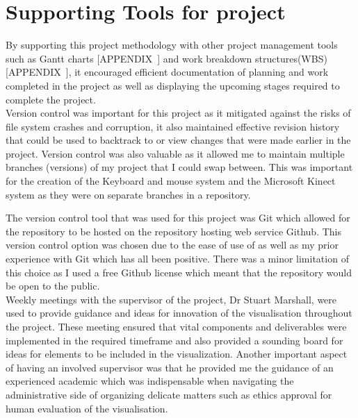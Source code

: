 \section{Supporting Tools for project}
By supporting this project methodology with other project management tools such
as Gantt charts [APPENDIX~] and work breakdown structures(WBS) [APPENDIX~], it
encouraged efficient documentation of planning and work completed in the project
as well as displaying the upcoming stages required to complete the project.
\\

Version control was important for this project as it mitigated against the risks
of file system crashes and corruption, it also maintained effective revision
history that could be used to backtrack to or view changes that were made
earlier in the project. Version control was also valuable as it allowed me to
maintain multiple branches (versions) of my project that I could swap between.
This was important for the creation of the Keyboard and mouse system and the
Microsoft Kinect system as they were on separate branches in a repository. 

The version control tool that was used for this project was Git which allowed
for the repository to be hosted on the repository hosting web service Github.
This version control option was chosen due to the ease of use of as well as my
prior experience with Git which has all been positive. There was a minor
limitation of this choice as I used a free Github license which meant that the
repository would be open to the public.
\\

Weekly meetings with the supervisor of the project, Dr Stuart Marshall, were
used to provide guidance and ideas for innovation of the visualisation
throughout the project. These meeting ensured that vital components and
deliverables were implemented in the required timeframe and also provided a
sounding board for ideas for elements to be included in the visualization.
Another important aspect of having an involved supervisor was that he provided
me the guidance of an experienced academic which was indispensable when
navigating the administrative side of organizing delicate matters such as ethics
approval for human evaluation of the visualisation.

